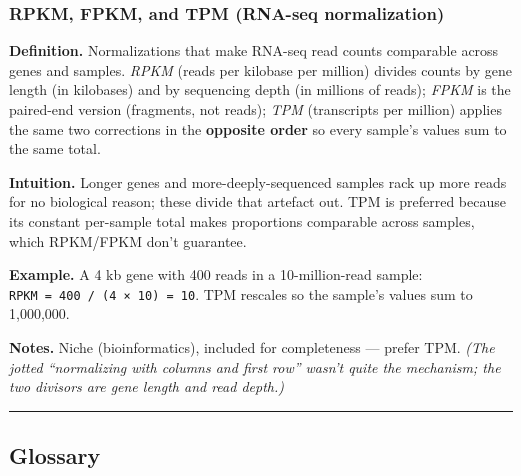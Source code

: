 \documentclass[
  10pt,
  letterpaper,
  onecolumn]{article}
\begin{document}
\hypertarget{rpkm-fpkm-and-tpm-rna-seq-normalization}{%
\subsubsection{RPKM, FPKM, and TPM (RNA-seq
normalization)}\label{rpkm-fpkm-and-tpm-rna-seq-normalization}}

\textbf{Definition.} Normalizations that make RNA-seq read counts
comparable across genes and samples. \emph{RPKM} (reads per kilobase per
million) divides counts by gene length (in kilobases) and by sequencing
depth (in millions of reads); \emph{FPKM} is the paired-end version
(fragments, not reads); \emph{TPM} (transcripts per million) applies the
same two corrections in the \textbf{opposite order} so every sample's
values sum to the same total.

\textbf{Intuition.} Longer genes and more-deeply-sequenced samples rack
up more reads for no biological reason; these divide that artefact out.
TPM is preferred because its constant per-sample total makes proportions
comparable across samples, which RPKM/FPKM don't guarantee.

\textbf{Example.} A 4 kb gene with 400 reads in a 10-million-read
sample: \texttt{RPKM\ =\ 400\ /\ (4\ ×\ 10)\ =\ 10}. TPM rescales so the
sample's values sum to 1,000,000.

\textbf{Notes.} Niche (bioinformatics), included for completeness ---
prefer TPM. \emph{(The jotted ``normalizing with columns and first row''
wasn't quite the mechanism; the two divisors are gene length and read
depth.)}

\begin{center}\rule{0.5\linewidth}{0.5pt}\end{center}

\hypertarget{glossary}{%
\subsection{Glossary}\label{glossary}}
\end{document}
